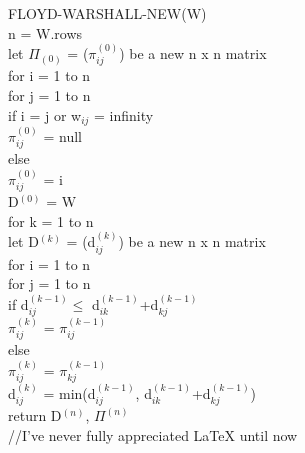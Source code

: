 \documentclass{article}
\begin{document}
FLOYD-WARSHALL-NEW(W) \\
\phantom{ayylmao} n = W.rows \\
\phantom{ayylmao}let $\Pi_{(0)}$ = ($\pi_{ij}^{(0)}$) be a new n x n matrix \\
\phantom{ayylmao}for i = 1 to n \\
\phantom{ayylmao}\phantom{ayy}for j = 1 to n\\
\phantom{ayylmao}\phantom{ayy}\phantom{ayy}if i = j or w$_{ij}$ = infinity\\
\phantom{ayylmao}\phantom{ayy}\phantom{ayy}\phantom{ayy}$\pi_{ij}^{(0)}$ = null\\
\phantom{ayylmao}\phantom{ayy}\phantom{ayy}else\\
\phantom{ayylmao}\phantom{ayy}\phantom{ayy}\phantom{ayy}$\pi_{ij}^{(0)}$ = i\\
\phantom{ayylmao} D$^{(0)}$ = W\\
\phantom{ayylmao} for k = 1 to n \\
\phantom{ayylmao}\phantom{ayy}let D$^{(k)}$ = (d$_{ij}^{(k)}$) be a new n x n matrix\\
\phantom{ayylmao}\phantom{ayy}for i = 1 to n\\
\phantom{ayylmao}\phantom{ayy}\phantom{ayy}for j = 1 to n\\
\phantom{ayylmao}\phantom{ayy}\phantom{ayy}\phantom{ayy} if d$_{ij}^{(k-1)} \leq$  d$_{ik}^{(k-1)}$+d$_{kj}^{(k-1)}$ \\
\phantom{ayylmao}\phantom{ayy}\phantom{ayy}\phantom{ayy}\phantom{ayy}$\pi_{ij}^{(k)}$ = $\pi_{ij}^{(k-1)}$ \\
\phantom{ayylmao}\phantom{ayy}\phantom{ayy}\phantom{ayy}else\\
\phantom{ayylmao}\phantom{ayy}\phantom{ayy}\phantom{ayy}\phantom{ayy} $\pi_{ij}^{(k)}$ = $\pi_{kj}^{(k-1)}$\\
\phantom{ayylmao}\phantom{ayy}\phantom{ayy}\phantom{ayy}	d$_{ij}^{(k)}$ = min(d$_{ij}^{(k-1)}$, d$_{ik}^{(k-1)}$+d$_{kj}^{(k-1)}$)\\
\phantom{ayylmao}return D$^{(n)}$, $\Pi^{(n)}$ \\
//I've never fully appreciated LaTeX until now
	
\end{document}
